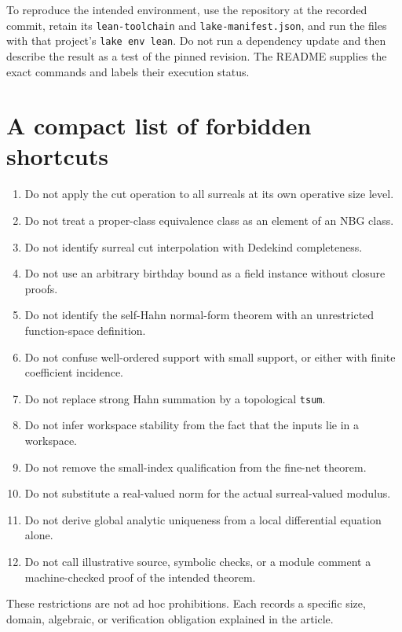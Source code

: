 \documentclass[11pt,letterpaper]{article}
\numberwithin{equation}{section}
\theoremstyle{definition}
\theoremstyle{remark}
\begin{document}
To reproduce the intended environment, use the repository at the recorded commit, retain its \texttt{lean-toolchain} and \texttt{lake-manifest.json}, and run the files with that project's \texttt{lake env lean}. Do not run a dependency update and then describe the result as a test of the pinned revision. The README supplies the exact commands and labels their execution status.

\section{A compact list of forbidden shortcuts}\label{app:shortcuts}
\begin{enumerate}
\item Do not apply the cut operation to all surreals at its own operative size level.
\item Do not treat a proper-class equivalence class as an element of an NBG class.
\item Do not identify surreal cut interpolation with Dedekind completeness.
\item Do not use an arbitrary birthday bound as a field instance without closure proofs.
\item Do not identify the self-Hahn normal-form theorem with an unrestricted function-space definition.
\item Do not confuse well-ordered support with small support, or either with finite coefficient incidence.
\item Do not replace strong Hahn summation by a topological \texttt{tsum}.
\item Do not infer workspace stability from the fact that the inputs lie in a workspace.
\item Do not remove the small-index qualification from the fine-net theorem.
\item Do not substitute a real-valued norm for the actual surreal-valued modulus.
\item Do not derive global analytic uniqueness from a local differential equation alone.
\item Do not call illustrative source, symbolic checks, or a module comment a machine-checked proof of the intended theorem.
\end{enumerate}
These restrictions are not ad hoc prohibitions. Each records a specific size, domain, algebraic, or verification obligation explained in the article.
\end{document}
